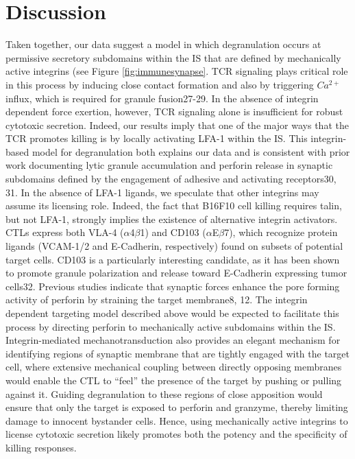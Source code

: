 \section{Discussion}
Taken together, our data suggest a model in which degranulation occurs at permissive secretory subdomains within the IS that are defined by mechanically active integrins (see Figure \ref{fig:immunesynapse}. TCR signaling plays critical role in this process by inducing close contact formation and also by triggering $Ca^{2+}$ influx, which is required for granule fusion27-29. In the absence of integrin dependent force exertion, however, TCR signaling alone is insufficient for robust cytotoxic secretion. Indeed, our results imply that one of the major ways that the TCR promotes killing is by locally activating LFA-1 within the IS. This integrin-based model for degranulation both explains our data and is consistent with prior work documenting lytic granule accumulation and perforin release in synaptic subdomains defined by the engagement of adhesive and activating receptors30, 31. In the absence of LFA-1 ligands, we speculate that other integrins may assume its licensing role. Indeed, the fact that B16F10 cell killing requires talin, but not LFA-1, strongly implies the existence of alternative integrin activators. CTLs express both VLA-4 ($\alpha$4$\beta$1) and CD103 ($\alpha$E$\beta$7), which recognize protein ligands (VCAM-1/2 and E-Cadherin, respectively) found on subsets of potential target cells. CD103 is a particularly interesting candidate, as it has been shown to promote granule polarization and release toward E-Cadherin expressing tumor cells32. Previous studies indicate that synaptic forces enhance the pore forming activity of perforin by straining the target membrane8, 12. The integrin dependent targeting model described above would be expected to facilitate this process by directing perforin to mechanically active subdomains within the IS. Integrin-mediated mechanotransduction also provides an elegant mechanism for identifying regions of synaptic membrane that are tightly engaged with the target cell, where extensive mechanical coupling between directly opposing membranes would enable the CTL to “feel” the presence of the target by pushing or pulling against it. Guiding degranulation to these regions of close apposition would ensure that only the target is exposed to perforin and granzyme, thereby limiting damage to innocent bystander cells. Hence, using mechanically active integrins to license cytotoxic secretion likely promotes both the potency and the specificity of killing responses. 

